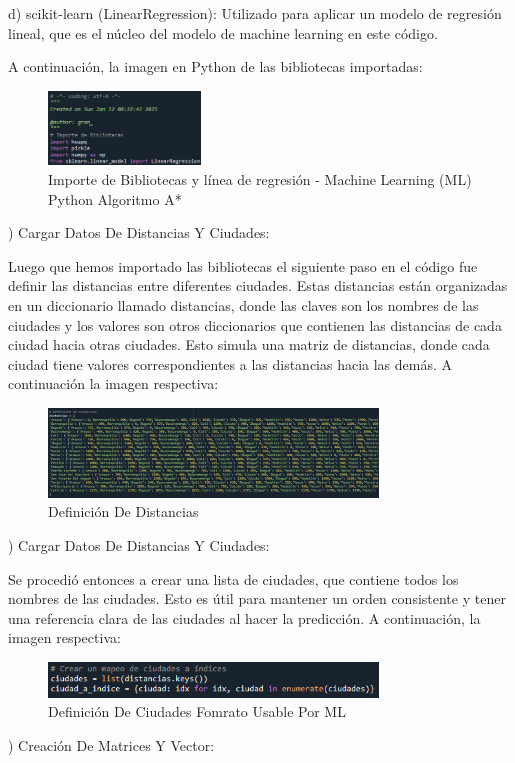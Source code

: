 \documentclass[conference]{IEEEtran}
\begin{document}
\begin{itemize}
	d) scikit-learn (LinearRegression): Utilizado para aplicar un modelo de regresión lineal, que es el núcleo del modelo de machine learning en este código.
	
	A continuación, la imagen en Python de las bibliotecas importadas:
		\begin{figure}[ht!] %
			\centering
			\includegraphics[width=1.59in]{Imagen27.png}
			\caption{Importe de Bibliotecas y línea de regresión - Machine Learning (ML) Python Algoritmo A*}
			\label{picture}
		\end{figure}
	) Cargar Datos De Distancias Y Ciudades:
	
	Luego que hemos importado las bibliotecas el siguiente paso en el código fue definir las distancias entre diferentes ciudades. Estas distancias están organizadas en un diccionario llamado distancias, donde las claves son los nombres de las ciudades y los valores son otros diccionarios que contienen las distancias de cada ciudad hacia otras ciudades. Esto simula una matriz de distancias, donde cada ciudad tiene valores correspondientes a las distancias hacia las demás. A continuación la imagen respectiva:
		\begin{figure}[ht!] %
			\centering
			\includegraphics[width=3.45in]{Imagen28.png}
			\caption{Definición De Distancias}
			\label{picture}
		\end{figure}
	) Cargar Datos De Distancias Y Ciudades:
	
	Se procedió entonces a crear una lista de ciudades, que contiene todos los nombres de las ciudades. Esto es útil para mantener un orden consistente y tener una referencia clara de las ciudades al hacer la predicción. A continuación, la imagen respectiva:
		\begin{figure}[ht!] %
			\centering
			\includegraphics[width=3.45in]{Imagen29.png}
			\caption{Definición De Ciudades Fomrato Usable Por ML}
			\label{picture}
		\end{figure}
	) Creación De Matrices Y Vector:
	

\end{itemize}
\end{document}
